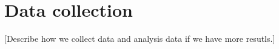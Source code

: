 

\section{ Data collection}

[Describe how we collect data and analysis data if we have more
resutls.]

